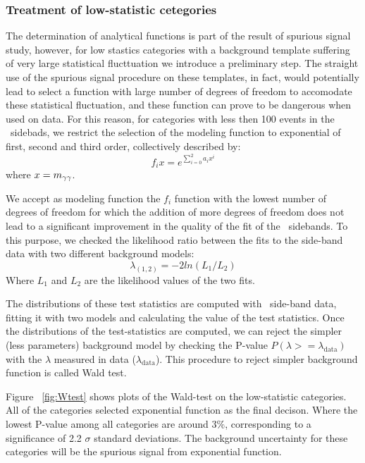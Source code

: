 \subsubsection{Treatment of low-statistic cetegories}
\label{sssec:bkg_functions}
The determination of analytical functions is part of the result of spurious signal study, however, for low stastics categories with a background template suffering of very large statistical flucttuation we introduce a preliminary step. The straight use of the spurious signal procedure on these templates, in fact, would potentially lead to select a function with large number of degrees of freedom to accomodate these statistical fluctuation, and these function can prove to be dangerous when used on data. For this reason, for categories with less then 100 events in the \myy\ sidebads, we restrict the selection of the modeling function to exponential of first, second and third order, collectively described by:
\begin{equation}
  f_i{x} = e^{\sum_{i=0}^2 a_i x^i}
\end{equation}
where $x = m_{\gamma\gamma}$. 

We accept as modeling function the $f_i$ function with the lowest number of degrees of freedom for which the addition of more degrees of freedom does not lead to a significant improvement in the quality of the fit of the \myy\ sidebands. 
To this purpose, we checked the likelihood ratio between the fits to the side-band data with two different background models:
\begin{equation}
\lambda_{(1,2)} = -2ln(L_{1}/L_{2})
\end{equation}
Where $L_{1}$ and $L_{2}$ are the likelihood values of the two fits.

The distributions of these test statistics are computed with \myy\
 side-band data, fitting it with two models and calculating the value of the test statistics.  
 Once the distributions of the test-statistics
are computed, we can reject the simpler (less parameters) background
model by checking the P-value $P(\lambda >= \lambda_{\mathrm{data}})$ with the $\lambda$ measured in data ($\lambda_{\mathrm{data}}$).
This procedure to reject simpler background function is called Wald test.

Figure ~\ref{fig:Wtest} shows plots of the Wald-test on the low-statistic categories. All of the categories selected exponential function as the final decison.
Where the lowest P-value among all categories are around 3$\%$, corresponding to a significance of 2.2 $\sigma$ standard deviations.  
The background uncertainty for these categories will be the spurious signal from exponential function.

